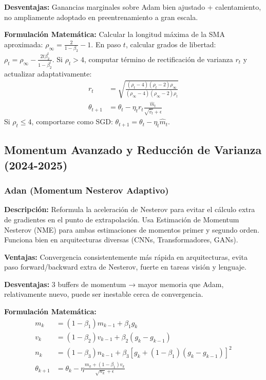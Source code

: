 \documentclass[11pt,a4paper]{article}
\begin{document}
\textbf{Desventajas:} Ganancias marginales sobre Adam bien ajustado + calentamiento, no ampliamente adoptado en preentrenamiento a gran escala.

\textbf{Formulación Matemática:} Calcular la longitud máxima de la SMA aproximada: $\rho_{\infty} = \frac{2}{1-\beta_2} - 1$. En paso $t$, calcular grados de libertad: $\rho_t = \rho_{\infty} - \frac{2t\beta_2^t}{1-\beta_2^t}$.
Si $\rho_t > 4$, computar término de rectificación de varianza $r_t$ y actualizar adaptativamente:
\begin{align}
r_t &= \sqrt{\frac{(\rho_t - 4)(\rho_t - 2)\rho_{\infty}}{(\rho_{\infty} - 4)(\rho_{\infty} - 2)\rho_t}} \\
\theta_{t+1} &= \theta_t - \eta_t r_t \frac{\hat{m}_t}{\sqrt{\hat{v}_t} + \epsilon}
\end{align}
Si $\rho_t \leq 4$, comportarse como SGD: $\theta_{t+1} = \theta_t - \eta_t \hat{m}_t$.

\subsection{Momentum Avanzado y Reducción de Varianza (2024-2025)}

\subsubsection{Adan (Momentum Nesterov Adaptivo)}

\textbf{Descripción:} Reformula la aceleración de Nesterov para evitar el cálculo extra de gradientes en el punto de extrapolación. Usa Estimación de Momentum Nesterov (NME) para ambas estimaciones de momentos primer y segundo orden. Funciona bien en arquitecturas diversas (CNNs, Transformadores, GANs).

\textbf{Ventajas:} Convergencia consistentemente más rápida en arquitecturas, evita paso forward/backward extra de Nesterov, fuerte en tareas visión y lenguaje.

\textbf{Desventajas:} 3 buffers de momentum → mayor memoria que Adam, relativamente nuevo, puede ser inestable cerca de convergencia.

\textbf{Formulación Matemática:}
\begin{align}
m_k &= (1 - \beta_1) m_{k-1} + \beta_1 g_k \\
v_k &= (1 - \beta_2) v_{k-1} + \beta_2 (g_k - g_{k-1}) \\
n_k &= (1 - \beta_3) n_{k-1} + \beta_3 [g_k + (1 - \beta_1)(g_k - g_{k-1})]^2 \\
\theta_{k+1} &= \theta_k - \eta \frac{m_k + (1 - \beta_1) v_k}{\sqrt{n_k} + \epsilon}
\end{align}
\end{document}

